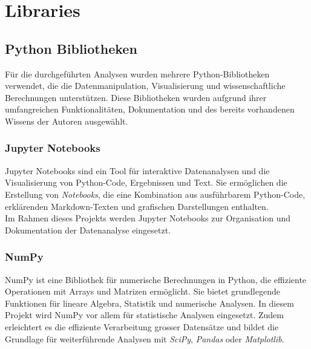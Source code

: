 

\chapter{Libraries} %

\label{AppendixA} %


\section{Python Bibliotheken}
Für die durchgeführten Analysen wurden mehrere Python-Bibliotheken verwendet, die die Datenmanipulation, Visualisierung und wissenschaftliche Berechnungen unterstützen. Diese Bibliotheken wurden aufgrund ihrer umfangreichen Funktionalitäten, Dokumentation und des bereits vorhandenen Wissens der Autoren ausgewählt. 


\subsection{Jupyter Notebooks}  
Jupyter Notebooks sind ein Tool für interaktive Datenanalysen und die Visualisierung von Python-Code, Ergebnissen und Text. Sie ermöglichen die Erstellung von \textit{Notebooks}, die eine Kombination aus ausführbarem Python-Code, erklärenden Markdown-Texten und grafischen Darstellungen enthalten. \parencite{noauthor_project_nodate} \\
Im Rahmen dieses Projekts werden Jupyter Notebooks zur Organisation und Dokumentation der Datenanalyse eingesetzt. 

\subsection{NumPy}
NumPy ist eine Bibliothek für numerische Berechnungen in Python, die effiziente Operationen mit Arrays und Matrizen ermöglicht. Sie bietet grundlegende Funktionen für lineare Algebra, Statistik und numerische Analysen. In diesem Projekt wird NumPy vor allem für statistische Analysen eingesetzt. Zudem erleichtert es die effiziente Verarbeitung grosser Datensätze und bildet die Grundlage für weiterführende Analysen mit \textit{SciPy}, \textit{Pandas} oder \textit{Matplotlib}. \parencite{noauthor_numpy_nodate} \parencite{noauthor_what_nodate}


